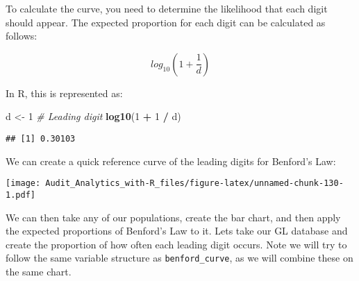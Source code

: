 \documentclass[
]{book}
\newenvironment{Shaded}{\begin{snugshade}}{\end{snugshade}}
\newcommand{\CommentTok}[1]{\textcolor[rgb]{0.56,0.35,0.01}{\textit{#1}}}
\newcommand{\DataTypeTok}[1]{\textcolor[rgb]{0.13,0.29,0.53}{#1}}
\newcommand{\DecValTok}[1]{\textcolor[rgb]{0.00,0.00,0.81}{#1}}
\newcommand{\KeywordTok}[1]{\textcolor[rgb]{0.13,0.29,0.53}{\textbf{#1}}}
\newcommand{\NormalTok}[1]{#1}
\newcommand{\OperatorTok}[1]{\textcolor[rgb]{0.81,0.36,0.00}{\textbf{#1}}}
\newcommand{\StringTok}[1]{\textcolor[rgb]{0.31,0.60,0.02}{#1}}
\begin{document}
To calculate the curve, you need to determine the likelihood that each digit should appear. The expected proportion for each digit can be calculated as follows:

\[log_{10}\left( 1 + \frac{1}{d}\right)\]

In R, this is represented as:

\begin{Shaded}
\begin{Highlighting}[]
\NormalTok{d <-}\StringTok{ }\DecValTok{1} \CommentTok{# Leading digit}
\KeywordTok{log10}\NormalTok{(}\DecValTok{1} \OperatorTok{+}\StringTok{ }\DecValTok{1} \OperatorTok{/}\StringTok{ }\NormalTok{d)}
\end{Highlighting}
\end{Shaded}

\begin{verbatim}
## [1] 0.30103
\end{verbatim}

We can create a quick reference curve of the leading digits for Benford's Law:

\begin{Shaded}
\end{Shaded}

\texttt{[image: Audit\_Analytics\_with-R\_files/figure-latex/unnamed-chunk-130-1.pdf]}

We can then take any of our populations, create the bar chart, and then apply the expected proportions of Benford's Law to it. Lets take our GL database and create the proportion of how often each leading digit occurs. Note we will try to follow the same variable structure as \texttt{benford\_curve}, as we will combine these on the same chart.
\end{document}
